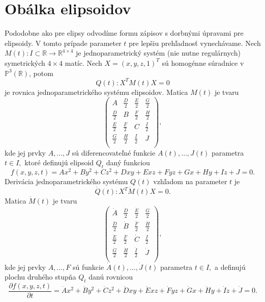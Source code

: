 \section{Obálka elipsoidov}
Pododobne ako pre elipsy odvodíme formu zápisov s dorbnými úpravami pre elipsoidy. V tomto prípade parameter $t$ pre lepšiu prehľadnosť vynechávame.
Nech $M(t) \colon I \subset \mathbb{R} \rightarrow \mathbb{R}^{4 \times 4}$ je jednoparametrický systém (nie nutne regulárnych) symetrických $4 \times 4$ matíc. Nech $ X = (x, y, z, 1)^T$ sú homogénne súradnice v $\mathbb{P}^3(\mathbb{R})$, potom
\begin{equation*}
Q(t) \colon X^T M(t) X = 0
\end{equation*}
je rovnica jednoparametrického systému elipsoidov. Matica $M(t)$ je tvaru
$$
\left(\begin{matrix} 
A & \frac{D}{2} & \frac{E}{2} & \frac{G}{2} \\
\frac{D}{2} & B & \frac{F}{2} & \frac{H}{2} \\
\frac{E}{2} & \frac{F}{2} & C & \frac{I}{2} \\
\frac{G}{2} & \frac{H}{2} & \frac{I}{2} & J \\
\end{matrix} \right),
$$
kde jej prvky $A, \dots, J$ sú diferencovateľné funkcie $A(t), \dots, J(t)$ parametra $t \in I,$ ktoré definujú elipsoid $Q_t$ daný funkciou 
$$
f(x, y, z, t) = Ax^2 + By^2 + Cz^2 + Dxy + Exz + Fyz + Gx + Hy + Iz + J = 0.
$$
Derivácia jednoparametrického systému $Q(t)$ vzhľadom na parameter $t$ je 
\begin{equation*}
\dot{Q}(t) \colon X^T \dot{M}(t) X = 0.
\end{equation*}
Matica $\dot{M}(t)$ je tvaru
$$
\left(\begin{matrix} 
\dot{A} & \frac{\dot{D}}{2} & \frac{\dot{E}}{2} & \frac{\dot{G}}{2} \\
\frac{\dot{D}}{2} & \dot{B} & \frac{\dot{F}}{2} & \frac{\dot{H}}{2} \\
\frac{\dot{E}}{2} & \frac{\dot{F}}{2} & \dot{C} & \frac{\dot{I}}{2} \\
\frac{\dot{G}}{2} & \frac{\dot{H}}{2} & \frac{\dot{I}}{2} & \dot{J} \\
\end{matrix} \right),
$$
kde jej prvky $A, \dots, F$ sú funkcie $\dot{A}(t), \dots, \dot{J}(t)$ parametra $t \in I,$ a definujú plochu druhého stupňa $Q_t$ danú rovnicou 
$$\dfrac{\partial f(x, y, z, t)}{\partial t} = \dot{A}x^2 + \dot{B}y^2 + \dot{C}z^2 + \dot{D}xy + \dot{E}xz + \dot{F}yz + \dot{G}x + \dot{H}y + \dot{I}z + \dot{J} = 0.$$

